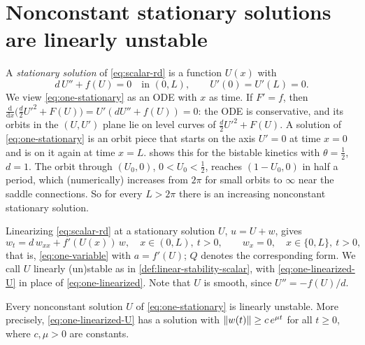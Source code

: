 \section{Nonconstant stationary solutions are linearly unstable}\label{sec:one-nonconstant}

A \emph{stationary solution} of \eqref{eq:scalar-rd} is a function $U(x)$ with
\begin{equation}\label{eq:one-stationary}
  d\,U'' + f(U) = 0 \quad\text{in } (0,L),\qquad U'(0)=U'(L)=0 .
\end{equation}
We view \eqref{eq:one-stationary} as an ODE with $x$ as time. If $F'=f$, then
$\frac{\mathrm d}{\mathrm dx}\big(\frac d2U'^2+F(U)\big)=U'(dU''+f(U))=0$: the ODE is
conservative, and its orbits in the $(U,U')$ plane lie on level curves of
$\frac d2U'^2+F(U)$. A solution of \eqref{eq:one-stationary} is an orbit piece that
starts on the axis $U'=0$ at time $x=0$ and is on it again at time $x=L$.
 shows this for the bistable kinetics with
$\theta=\frac12$, $d=1$. The orbit through $(U_0,0)$, $0<U_0<\frac12$, reaches
$(1-U_0,0)$ in half a period, which (numerically) increases from $2\pi$ for small
orbits to $\infty$ near the saddle connections. So for every $L>2\pi$ there is an
increasing nonconstant stationary solution.

Linearizing \eqref{eq:scalar-rd} at a stationary solution $U$, $u=U+w$, gives
\begin{equation}\label{eq:one-linearized-U}
  w_t = d\,w_{xx} + f'(U(x))\,w,\quad x\in(0,L),\ t>0,\qquad
  w_x=0,\quad x\in\{0,L\},\ t>0 ,
\end{equation}
that is, \eqref{eq:one-variable} with $a=f'(U)$; $Q$ denotes the corresponding form.
We call $U$ linearly (un)stable as in \cref{def:linear-stability-scalar}, with
\eqref{eq:one-linearized-U} in place of \eqref{eq:one-linearized}. Note that $U$ is
smooth, since $U''=-f(U)/d$.

\begin{theorem}\label{thm:nonconstant-unstable}
Every nonconstant solution $U$ of \eqref{eq:one-stationary} is linearly unstable.
More precisely, \eqref{eq:one-linearized-U} has a solution with
$\left\lVert w(t)\right\rVert\ge c\,e^{\mu t}$ for all $t\ge0$, where $c,\mu>0$ are constants.
\end{theorem}

